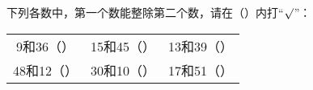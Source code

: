 下列各数中，第一个数能整除第二个数，请在（\hspace{4em}）内打“$\surd$”：\\
\begin{tabular}{ccc}
	9和36（\hspace{4em}） & 15和45（\hspace{4em}） & 13和39（\hspace{4em}）\\
	48和12（\hspace{4em}） & 30和10（\hspace{4em}） & 17和51（\hspace{4em}）\\
\end{tabular}